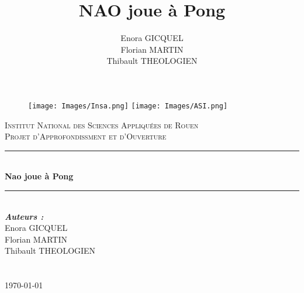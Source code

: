 \documentclass[a4paper,12pt]{article}
\title{NAO joue à Pong}
\author{
	Enora GICQUEL\\
	Florian MARTIN\\
	Thibault THEOLOGIEN
}
\begin{document}
%
%

\begin{titlepage}
\thispagestyle{empty}
\begin{figure}
	\texttt{[image: Images/Insa.png]}\hfill
	\texttt{[image: Images/ASI.png]}\
\end{figure}

\newcommand{\HRule}{\rule{\linewidth}{0.5mm}} 
\center 
{}\textsc{\huge Institut National des Sciences Appliqu\'{e}es de Rouen}\\[1.5cm] 
\textsc{\Large Projet d'Approfondissment et d'Ouverture}\\[2cm] 

\HRule \\[0.4cm]
{ \huge \bfseries Nao joue à Pong}\\[0.2cm] 
\HRule \\[2.5cm]
  


\large \emph{\textbf{Auteurs :}}\\
	Enora GICQUEL\\
	Florian MARTIN\\
	Thibault THEOLOGIEN \\

~\\ ~\\[1cm]

\vfill{\today}\\[3cm]

\end{titlepage}

	\pagebreak
	\tableofcontents
	\pagebreak

	
	
	
	
	
	
	
	
	
	
\end{document}
